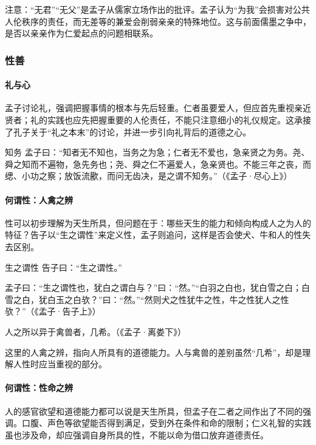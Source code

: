 注意：“无君”“无父”是孟子从儒家立场作出的批评。孟子认为“为我”会损害对公共人伦秩序的责任，而无差等的兼爱会削弱亲亲的特殊地位。这与前面儒墨之争中，是否以亲亲作为仁爱起点的问题相联系。

\subsubsection{性善}

\paragraph{礼与心}

孟子讨论礼，强调把握事情的根本与先后轻重。仁者虽要爱人，但应首先重视亲近贤者；礼的实践也应先把握重要的人伦责任，不能只注意细小的礼仪规定。这承接了孔子关于“礼之本末”的讨论，并进一步引向礼背后的道德之心。

\begin{fancybox}{知务}
    孟子曰：“知者无不知也，当务之为急；仁者无不爱也，急亲贤之为务。尧、舜之知而不遍物，急先务也；尧、舜之仁不遍爱人，急亲贤也。不能三年之丧，而缌、小功之察；放饭流歠，而问无齿决，是之谓不知务。”（《孟子·尽心上》）
\end{fancybox}

\paragraph{何谓性：人禽之辨}

性可以初步理解为天生所具，但问题在于：哪些天生的能力和倾向构成人之为人的特征？告子以“生之谓性”来定义性，孟子则追问，这样是否会使犬、牛和人的性失去区别。

\begin{fancybox}{生之谓性}
    告子曰：“生之谓性。”

    孟子曰：“生之谓性也，犹白之谓白与？”曰：“然。”“白羽之白也，犹白雪之白；白雪之白，犹白玉之白欤？”曰：“然。”“然则犬之性犹牛之性，牛之性犹人之性欤？”（《孟子·告子上》）

    人之所以异于禽兽者，几希。（《孟子·离娄下》）
\end{fancybox}

这里的人禽之辨，指向人所具有的道德能力。人与禽兽的差别虽然“几希”，却是理解人性时应当重视的部分。

\paragraph{何谓性：性命之辨}

人的感官欲望和道德能力都可以说是天生所具，但孟子在二者之间作出了不同的强调。口腹、声色等欲望能否得到满足，受到外在条件和命的限制；仁义礼智的实践虽也涉及命，却应强调自身所具的性，不能以命为借口放弃道德责任。

